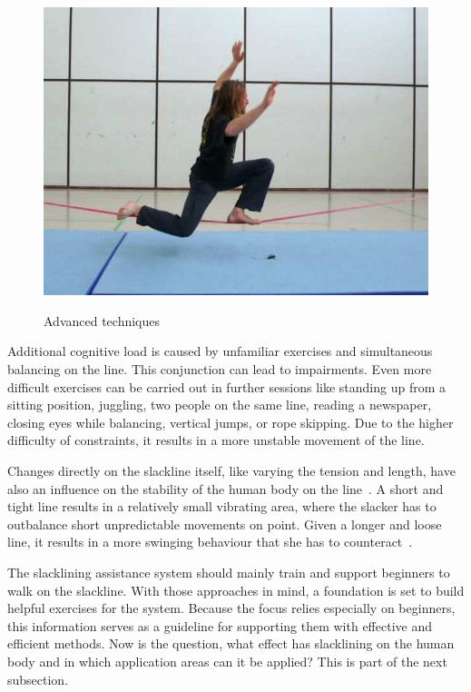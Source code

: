 \begin{figure}[htb]
\begin{minipage}[t]{0.3\linewidth}
		\label{fig:slacklineAdvancedHandsBehindBack}
	\end{minipage}	
	\hfill
	\begin{minipage}[t]{0.38\linewidth}
		\centering
		\includegraphics[width=1\linewidth]{Pictures/slacklineAdvancedDropknee}
		\label{fig:slacklineAdvancedDropknee}
	\end{minipage}	
	\caption{Advanced techniques~\cite{Kroiss2007-ab}}
	\label{fig:advancedExercises}
\end{figure}

Additional cognitive load is caused by unfamiliar exercises and simultaneous balancing on the line. This conjunction can lead to impairments. Even more difficult exercises can be carried out in further sessions like standing up from a sitting position, juggling, two people on the same line, reading a newspaper, closing eyes while balancing, vertical jumps, or rope skipping. Due to the higher difficulty of constraints, it results in a more unstable movement of the line.

Changes directly on the slackline itself, like varying the tension and length, have also an influence on the stability of the human body on the line~\cite{Keller2012-xh, Pfusterschmied2013-yy, Pfusterschmied2013-kq}. A short and tight line results in a relatively small vibrating area, where the slacker has to outbalance short unpredictable movements on point. Given a longer and loose line, it results in a more swinging behaviour that she has to counteract~\cite{Kroiss2007-ab}.
 
The slacklining assistance system should mainly train and support beginners to walk on the slackline.
With those approaches in mind, a foundation is set to build helpful exercises for the system.
Because the focus relies especially on beginners, this information serves as a guideline for supporting them with effective and efficient methods.
Now is the question, what effect has slacklining on the human body and in which application areas can it be applied?
This is part of the next subsection.

